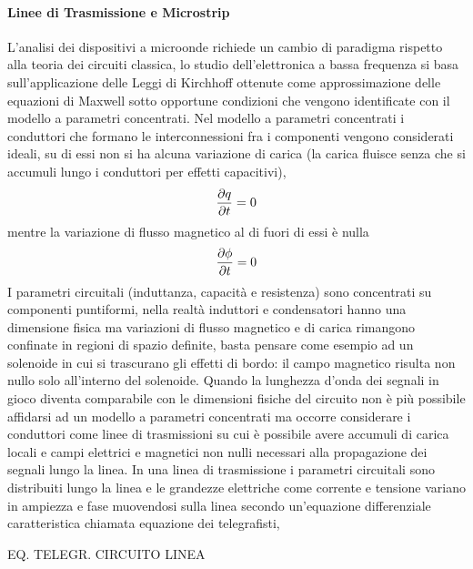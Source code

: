 \documentclass[12pt]{article}
\begin{document}
\paragraph{Linee di Trasmissione e Microstrip}
L'analisi dei dispositivi a microonde richiede un cambio di paradigma rispetto alla teoria dei circuiti classica, lo studio dell'elettronica a bassa frequenza si basa sull'applicazione delle Leggi di Kirchhoff ottenute come approssimazione delle equazioni di Maxwell sotto opportune condizioni che vengono identificate con il modello a parametri concentrati.
Nel modello a parametri concentrati i conduttori che formano le interconnessioni fra i componenti vengono considerati ideali, su di essi non si ha alcuna variazione di carica (la carica fluisce senza che si accumuli lungo i conduttori per effetti capacitivi),
\begin{equation}
    \pdv{q}{t}=0
\end{equation}
mentre la variazione di flusso magnetico al di fuori di essi è nulla
\begin{equation}
    \pdv{\phi}{t}=0
\end{equation}
I parametri circuitali (induttanza, capacità e resistenza) sono concentrati su componenti puntiformi, nella realtà induttori e condensatori hanno una dimensione fisica ma variazioni di flusso magnetico e di carica rimangono confinate in regioni di spazio definite, basta pensare come esempio ad un solenoide in cui si trascurano gli effetti di bordo: il campo magnetico risulta non nullo solo all'interno del solenoide.
Quando la lunghezza d'onda dei segnali in gioco diventa comparabile con le dimensioni fisiche del circuito non è più possibile affidarsi ad un modello a parametri concentrati ma occorre considerare i conduttori come linee di trasmissioni su cui è possibile avere accumuli di carica locali e campi elettrici e magnetici non nulli necessari alla propagazione dei segnali lungo la linea.
In una linea di trasmissione i parametri circuitali sono distribuiti lungo la linea e le grandezze elettriche come corrente e tensione variano in ampiezza e fase muovendosi sulla linea secondo un'equazione differenziale caratteristica chiamata equazione dei telegrafisti,

EQ. TELEGR. 
CIRCUITO LINEA
\end{document}
